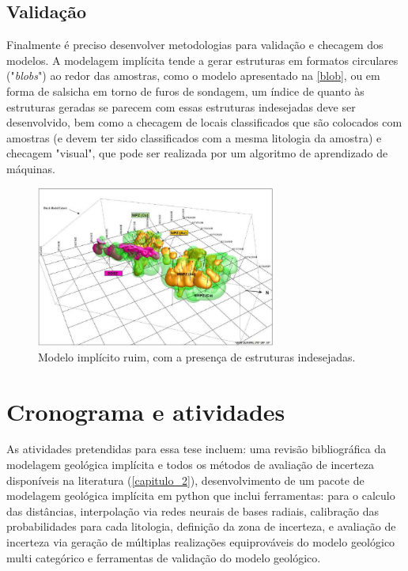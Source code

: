 \subsection{Validação}

Finalmente é preciso desenvolver metodologias para validação e checagem dos modelos. A modelagem implícita tende a gerar estruturas em formatos circulares ("\textit{blobs}") ao redor das amostras, como o modelo apresentado na \autoref{blob}, ou em forma de salsicha em torno de furos de sondagem, um índice de quanto às estruturas geradas se parecem com essas estruturas indesejadas deve ser desenvolvido, bem como a checagem de locais classificados que são colocados com amostras (e devem ter sido classificados com a mesma litologia da amostra) e checagem "visual", que pode ser realizada por um algoritmo de aprendizado de máquinas.

\begin{figure}[H]
	\caption{\label{blob}Modelo implícito ruim, com a presença de estruturas indesejadas.}
	\begin{center}
		\includegraphics[width=0.7\textwidth]{capitulo_3/blob.jpg}
	\end{center}
\end{figure}

\section{Cronograma e atividades}

As atividades pretendidas para essa tese incluem: uma revisão bibliográfica da modelagem geológica implícita e todos os métodos de avaliação de incerteza disponíveis na literatura (\autoref{capitulo_2}), desenvolvimento de um pacote de modelagem geológica implícita em python que inclui ferramentas: para o calculo das distâncias, interpolação via redes neurais de bases radiais, calibração das probabilidades para cada litologia, definição da zona de incerteza, e avaliação de incerteza via geração de múltiplas realizações equiprováveis do modelo geológico multi categórico e ferramentas de validação do modelo geológico.

